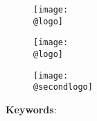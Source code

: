 

\begin{titlepage}
    \begin{center}
      \makeatletter 
        \begin{figure}[!htb]
          \centering
          
          \ifx\@secondlogo\none
            \begin{minipage}{0.42\textwidth}
            \centering       
            \texttt{[image: \\@logo]}
            \end{minipage}
          \else
            \begin{minipage}{0.42\textwidth}
            \centering       
            \texttt{[image: \\@logo]}
            \end{minipage}
            \hspace{1cm}
            \begin{minipage}{0.42\textwidth}
            \centering       
            \texttt{[image: \\@secondlogo]}
            \end{minipage}
          \fi

        \end{figure}
      \makeatother
      \vspace*{0.25cm}

        \maketitle

        \vspace{2cm}
        \large 
        \textbf{Keywords}:\\
        \makeatletter
        \textbf{\@keywords}
        \makeatother
        

\end{center}
\end{titlepage}
